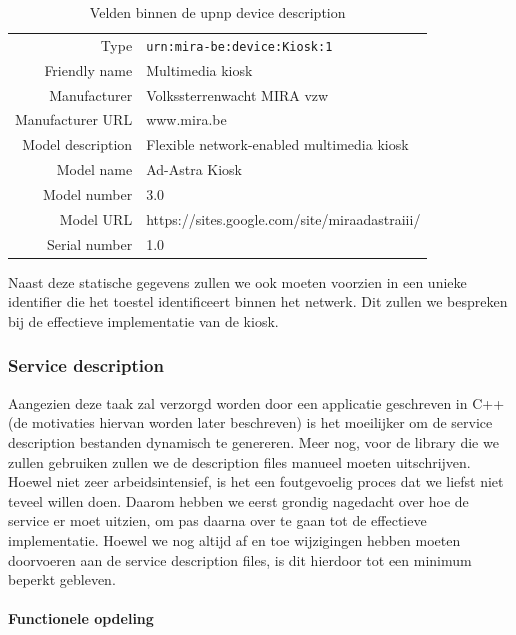 \begin{table}
  \begin{center}
    \begin{tabular}{r l}
    \hline
    Type & \texttt{urn:mira-be:device:Kiosk:1} \\
    Friendly name & Multimedia kiosk \\
    Manufacturer & Volkssterrenwacht MIRA vzw \\
    Manufacturer URL & www.mira.be \\
    Model description & Flexible network-enabled multimedia kiosk \\
    Model name & Ad-Astra Kiosk \\
    Model number & 3.0 \\
    Model URL & https://sites.google.com/site/miraadastraiii/ \\
    Serial number & 1.0 \\
    \hline
    \end{tabular}
  \end{center}
  \caption{Velden binnen de \ac{upnp} device description}
  \label{tbl:upnp:device}
\end{table}

Naast deze statische gegevens zullen we ook moeten voorzien in een unieke identifier die het toestel identificeert binnen het netwerk. Dit zullen we bespreken bij de effectieve implementatie van de kiosk.

\subsubsection{Service description}

Aangezien deze taak zal verzorgd worden door een applicatie geschreven in C++ (de motivaties hiervan worden later beschreven) is het moeilijker om de service description bestanden dynamisch te genereren. Meer nog, voor de library die we zullen gebruiken zullen we de description files manueel moeten uitschrijven. Hoewel niet zeer arbeidsintensief, is het een foutgevoelig proces dat we liefst niet teveel willen doen. Daarom hebben we eerst grondig nagedacht over hoe de service er moet uitzien, om pas daarna over te gaan tot de effectieve implementatie. Hoewel we nog altijd af en toe wijzigingen hebben moeten doorvoeren aan de service description files, is dit hierdoor tot een minimum beperkt gebleven.

\paragraph{Functionele opdeling}

